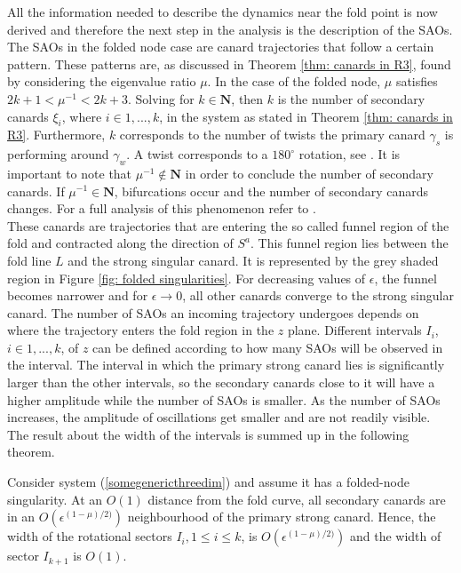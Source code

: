 All the information needed to describe the dynamics near the fold point is now derived and therefore the next step in the analysis is the description of the SAOs. The SAOs in the folded node case are canard trajectories that follow a certain pattern. These patterns are, as discussed in Theorem \ref{thm: canards in R3}, found by considering the eigenvalue ratio $\mu$.
In the case of the folded node, $\mu$ satisfies $2k+1 < \mu^{-1} < 2k +3 $. Solving for $k \in \mathbf{N}$, then $k$ is the number of secondary canards $\xi_i$, where $i \in 1,...,k$, in the system as stated in Theorem \ref{thm: canards in R3}. Furthermore, $k$ corresponds to the number of twists the primary canard $\gamma_s$ is performing around $\gamma_w$. A twist corresponds to a $180^{\circ}$ rotation, see \citet{Kuehn}. It is important to note that $\mu^{-1} \notin \mathbf{N}$ in order to conclude the number of secondary canards. If $\mu^{-1} \in \mathbf{N}$, bifurcations occur and the number of secondary canards changes. For a full analysis of this phenomenon refer to \citet{wechselberger2005}.\\

These canards are trajectories that are entering the so called funnel region of the fold and contracted along the direction of $S^a$. This funnel region lies between the fold line $L$ and the strong singular canard. It is represented by the grey shaded region in Figure \ref{fig: folded singularities}.
For decreasing values of $\epsilon$, the funnel becomes narrower and for $\epsilon \to 0$, all other canards converge to the strong singular canard.
The number of SAOs an incoming trajectory undergoes depends on where the trajectory enters the fold region in the $z$ plane. Different intervals $I_i$, $i \in 1,...,k$, of $z$ can be defined according to how many SAOs will be observed in the interval.
The interval in which the primary strong canard lies is significantly larger than the other intervals, so the secondary canards close to it will have a higher amplitude while the number of SAOs is smaller. As the number of SAOs increases, the amplitude of oscillations get smaller and are not readily visible.
The result about the width of the intervals is summed up in the following theorem.

\begin{theorem}
Consider system (\ref{somegenericthreedim}) and assume it has a folded-node singularity. At an $O(1)$ distance from the fold curve, all secondary canards are in an $O(\epsilon^{(1- \mu)/2)})$ neighbourhood of the primary strong canard. Hence, the width of the  rotational sectors $I_i, 1 \leq i \leq k$, is $O(\epsilon^{(1- \mu)/2)})$ and the width of sector $I_{k+1}$ is $O(1)$.
\end{theorem}


